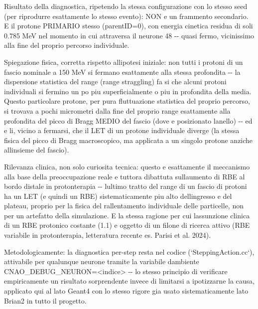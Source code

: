 \documentclass[
  italian,
]{article}
\begin{document}
Risultato della diagnostica, ripetendo la stessa configurazione con lo stesso seed (per riprodurre esattamente lo stesso evento): NON e\textquotesingle{} un frammento secondario. E\textquotesingle{} il protone PRIMARIO stesso (parentID=0), con energia cinetica residua di soli 0.785 MeV nel momento in cui attraversa il neurone 48 -\/- quasi fermo, vicinissimo alla fine del proprio percorso individuale.

Spiegazione fisica, corretta rispetto all\textquotesingle ipotesi iniziale: non tutti i protoni di un fascio nominale a 150 MeV si fermano esattamente alla stessa profondita\textquotesingle{} -\/- la dispersione statistica del range (range straggling) fa si\textquotesingle{} che alcuni protoni individuali si fermino un po\textquotesingle{} piu\textquotesingle{} superficialmente o piu\textquotesingle{} in profondita\textquotesingle{} della media. Questo particolare protone, per pura fluttuazione statistica del proprio percorso, si trovava a pochi micrometri dalla fine del proprio range esattamente alla profondita\textquotesingle{} del picco di Bragg MEDIO del fascio (dove e\textquotesingle{} posizionato l\textquotesingle anello) -\/- ed e\textquotesingle{} li\textquotesingle, vicino a fermarsi, che il LET di un protone individuale diverge (la stessa fisica del picco di Bragg macroscopico, ma applicata a un singolo protone anziche\textquotesingle{} all\textquotesingle insieme del fascio).

Rilevanza clinica, non solo curiosita\textquotesingle{} tecnica: questo e\textquotesingle{} esattamente il meccanismo alla base della preoccupazione reale e tuttora dibattuta sull\textquotesingle aumento di RBE al bordo distale in protonterapia -\/- l\textquotesingle ultimo tratto del range di un fascio di protoni ha un LET (e quindi un RBE) sistematicamente piu\textquotesingle{} alto dell\textquotesingle ingresso e del plateau, proprio per la fisica del rallentamento individuale delle particelle, non per un artefatto della simulazione. E\textquotesingle{} la stessa ragione per cui l\textquotesingle assunzione clinica di un RBE protonico costante (1.1) e\textquotesingle{} oggetto di un filone di ricerca attivo (RBE variabile in protonterapia, letteratura recente es. Parisi et al. 2024).

Metodologicamente: la diagnostica per-step resta nel codice (`SteppingAction.cc`), attivabile per qualunque neurone tramite la variabile d\textquotesingle ambiente CNAO\_\allowbreak{}DEBUG\_\allowbreak{}NEURON=\textless indice\textgreater{} -\/- lo stesso principio di verificare empiricamente un risultato sorprendente invece di limitarsi a ipotizzarne la causa, applicato qui al lato Geant4 con lo stesso rigore gia\textquotesingle{} usato sistematicamente lato Brian2 in tutto il progetto.
\end{document}
